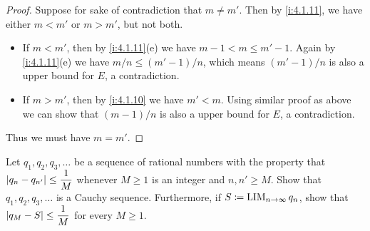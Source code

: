 \begin{proof}
  Suppose for sake of contradiction that \(m \neq m'\).
  Then by \cref{i:4.1.11}, we have either \(m < m'\) or \(m > m'\), but not both.
  \begin{itemize}
    \item If \(m < m'\), then by \cref{i:4.1.11}(e) we have \(m - 1 < m \leq m' - 1\).
          Again by \cref{i:4.1.11}(e) we have \(m / n \leq (m' - 1) / n\), which means \((m' - 1) / n\) is also a upper bound for \(E\), a contradiction.
    \item If \(m > m'\), then by \cref{i:4.1.10} we have \(m' < m\).
          Using similar proof as above we can show that \((m - 1) / n\) is also a upper bound for \(E\), a contradiction.
  \end{itemize}
  Thus we must have \(m = m'\).
\end{proof}

\begin{ex}\label{i:ex:5.5.4}
  Let \(q_1, q_2, q_3, \dots\) be a sequence of rational numbers with the property that \(\left\lvert q_n - q_{n'}\right\rvert \leq \dfrac{1}{M}\) whenever \(M \geq 1\) is an integer and \(n, n' \geq M\).
  Show that \(q_1, q_2, q_3, \dots\) is a Cauchy sequence.
  Furthermore, if \(S \coloneqq \operatorname*{LIM}_{n \to \infty} q_n\), show that \(\left\lvert q_M - S\right\rvert \leq \dfrac{1}{M}\) for every \(M \geq 1\).
\end{ex}

